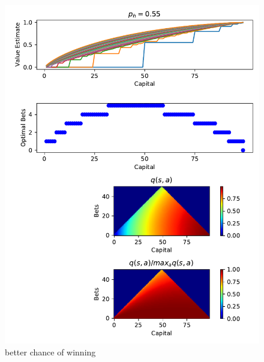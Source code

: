 \documentclass{article}
\begin{document}
\begin{figure}
	\includegraphics[width=\textwidth]{less_unfair}
	\centering
	\caption{\label{fig:less_unfair}better chance of winning}
\end{figure} 
\end{document}
